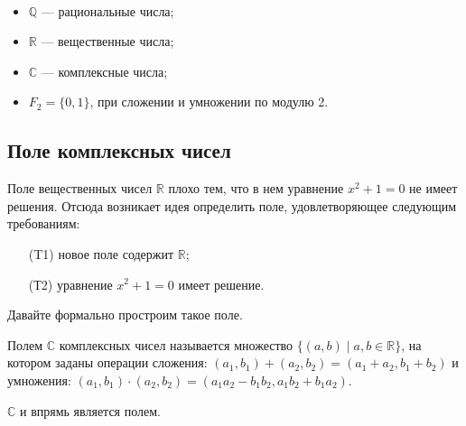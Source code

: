 \begin{Examples} \ 
\begin{itemize}
\item $\mathbb{Q}$ — рациональные числа; 
\item $\mathbb{R}$ — вещественные числа;
\item $\mathbb{C}$ — комплексные числа;
\item $F_2 = \{0, 1\}$, при сложении и умножении по модулю 2.
\end{itemize}
\end{Examples}

\subsection{Поле комплексных чисел}
Поле вещественных чисел $\mathbb{R}$ плохо тем, что в нем уравнение $x^2 + 1 = 0$ не имеет решения. Отсюда возникает идея определить поле, удовлетворяющее следующим требованиям:
\begin{itemize}
\item[(T1)] новое поле содержит $\mathbb{R}$;
\item[(Т2)] уравнение $x^2 +1 = 0$ имеет решение.
\end{itemize}
Давайте формально простроим такое поле.

\begin{Def}
Полем $\mathbb{C}$ комплексных чисел называется множество $\{(a, b) \mid a, b \in \mathbb{R}\}$, на котором заданы операции сложения: $(a_1, b_1) + (a_2, b_2) = (a_1 + a_2, b_1 + b_2)$ и умножения: $(a_1, b_1) \cdot (a_2, b_2) = (a_1a_2 - b_1b_2, a_1b_2 + b_1a_2)$.
\end{Def}

\begin{Suggestion}
$\mathbb{C}$ и впрямь является полем.
\end{Suggestion}

